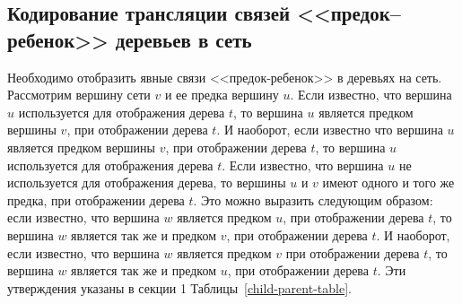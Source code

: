 \FloatBarrier
\subsection{Кодирование трансляции связей <<предок--ребенок>> деревьев в сеть}
\label{sec:parent-child}

Необходимо отобразить явные связи <<предок-ребенок>> в деревьях на сеть.
Рассмотрим вершину сети $v$ и ее предка вершину $u$.
Если известно, что вершина $u$ используется для отображения дерева $t$, то вершина $u$ является предком вершины $v$, при отображении дерева $t$.
И наоборот, если известно что вершина $u$ является предком вершины $v$, при отображении дерева $t$, то вершина $u$ используется для отображения дерева $t$.
Если известно, что вершина $u$ не используется для отображения дерева, то вершины $u$ и $v$ имеют одного и того же предка, при отображении дерева $t$.
Это можно выразить следующим образом: если известно, что вершина $w$ является предком $u$, при отображении дерева $t$, то вершина $w$ является так же и предком $v$, при отображении дерева $t$.
И наоборот, если известно, что вершина $w$ является предком $v$ при отображении дерева $t$, то вершина $w$ является так же и предком $u$, при отображении дерева $t$.
Эти утверждения указаны в секции 1 Таблицы~\ref{child-parent-table}.

